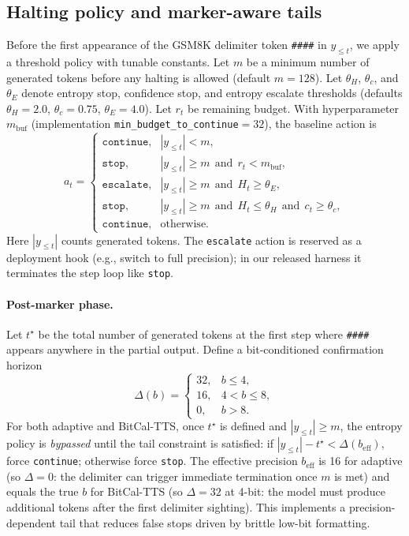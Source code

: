 \documentclass[11pt]{article}
\begin{document}
\subsection{Halting policy and marker-aware tails}
\label{sec:halting}
Before the first appearance of the GSM8K delimiter token \texttt{\#\#\#\#} in $y_{\le t}$, we apply a threshold policy with tunable constants. Let $m$ be a minimum number of generated tokens before any halting is allowed (default $m{=}128$). Let $\theta_H$, $\theta_c$, and $\theta_E$ denote entropy stop, confidence stop, and entropy escalate thresholds (defaults $\theta_H{=}2.0$, $\theta_c{=}0.75$, $\theta_E{=}4.0$). Let $r_t$ be remaining budget. With hyperparameter $m_{\mathrm{buf}}$ (implementation \texttt{min\_budget\_to\_continue}${=}32$), the baseline action is
\begin{equation}
  a_t =
  \begin{cases}
    \texttt{continue}, & |y_{\le t}| < m,\\[2pt]
    \texttt{stop}, & |y_{\le t}| \ge m\ \ \text{and}\ \ r_t < m_{\mathrm{buf}},\\[2pt]
    \texttt{escalate}, & |y_{\le t}| \ge m\ \ \text{and}\ \ H_t \ge \theta_E,\\[2pt]
    \texttt{stop}, & |y_{\le t}| \ge m\ \ \text{and}\ \ H_t \le \theta_H\ \ \text{and}\ \ c_t \ge \theta_c,\\[2pt]
    \texttt{continue}, & \text{otherwise.}
  \end{cases}
\end{equation}
Here $|y_{\le t}|$ counts generated tokens. The \texttt{escalate} action is reserved as a deployment hook (e.g., switch to full precision); in our released harness it terminates the step loop like \texttt{stop}.

\paragraph{Post-marker phase.}
Let $t^\star$ be the total number of generated tokens at the first step where \texttt{\#\#\#\#} appears anywhere in the partial output. Define a bit-conditioned confirmation horizon
\begin{equation}
  \Delta(b)=
  \begin{cases}
    32, & b\le 4,\\
    16, & 4<b\le 8,\\
    0,  & b>8.
  \end{cases}
\end{equation}
For both adaptive and BitCal-TTS, once $t^\star$ is defined and $|y_{\le t}|\ge m$, the entropy policy is \emph{bypassed} until the tail constraint is satisfied: if $|y_{\le t}|-t^\star < \Delta(b_{\mathrm{eff}})$, force \texttt{continue}; otherwise force \texttt{stop}. The effective precision $b_{\mathrm{eff}}$ is 16 for adaptive (so $\Delta{=}0$: the delimiter can trigger immediate termination once $m$ is met) and equals the true $b$ for BitCal-TTS (so $\Delta{=}32$ at 4-bit: the model must produce additional tokens after the first delimiter sighting). This implements a precision-dependent tail that reduces false stops driven by brittle low-bit formatting.
\end{document}
